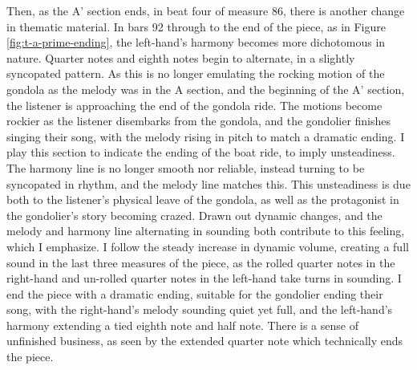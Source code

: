 Then, as the A' section ends, in beat four of measure 86, there is another change in thematic material. In bars 92 through to the end of the piece, as in Figure \ref{fig:t-a-prime-ending}\autocite{Henle_2002}, the left-hand's harmony becomes more dichotomous in nature. Quarter notes and eighth notes begin to alternate, in a slightly syncopated pattern. As this is no longer emulating the rocking motion of the gondola as the melody was in the A section, and the beginning of the A' section, the listener is approaching the end of the gondola ride. The motions become rockier as the listener disembarks from the gondola, and the gondolier finishes singing their song, with the melody rising in pitch to match a dramatic ending. I play this section to indicate the ending of the boat ride, to imply unsteadiness. The harmony line is no longer smooth nor reliable, instead turning to be syncopated in rhythm, and the melody line matches this. This unsteadiness is due both to the listener's physical leave of the gondola, as well as the protagonist in the gondolier's story becoming crazed. Drawn out dynamic changes, and the melody and harmony line alternating in sounding both contribute to this feeling, which I emphasize. I follow the steady increase in dynamic volume, creating a full sound in the last three measures of the piece, as the rolled quarter notes in the right-hand and un-rolled quarter notes in the left-hand take turns in sounding. I end the piece with a dramatic ending, suitable for the gondolier ending their song, with the right-hand's melody sounding quiet yet full, and the left-hand's harmony extending a tied eighth note and half note. There is a sense of unfinished business, as seen by the extended quarter note which technically ends the piece. 
